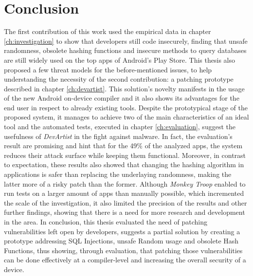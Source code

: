 \chapter{Conclusion}
The first contribution of this work used the empirical data in chapter \ref{ch:investigation} to show that developers still code insecurely, finding that unsafe randomness, obsolete hashing functions and insecure methods to query databases are still widely used on the top apps of Android's Play Store. This thesis also proposed a few threat models for the before-mentioned issues, to help understanding the necessity of the second contribution: a patching prototype described in chapter \ref{ch:devartist}. This solution's novelty manifests in the usage of the new Android on-device compiler and it also shows its advantages for the end user in respect to already existing tools. Despite the prototypical stage of the proposed system, it manages to achieve two of the main characteristics of an ideal tool and the automated tests, executed in chapter \ref{ch:evaluation}, suggest the usefulness of \emph{DevArtist} in the fight against malware. In fact, the evaluation's result are promising and hint that for the 49\% of the analyzed apps, the system reduces their attack surface while keeping them functional. Moreover, in contrast to expectation, these results also showed that changing the hashing algorithm in applications is safer than replacing the underlaying randomness, making the latter more of a risky patch than the former. Although \emph{Monkey Troop} enabled to run tests on a larger amount of apps than manually possible, which incremented the scale of the investigation, it also limited the precision of the results and other further findings, showing that there is a need for more research and development in the area. In conclusion, this thesis evaluated the need of patching vulnerabilities left open by developers, suggests a partial solution by creating a prototype addressing SQL Injections, unsafe Random usage and obsolete Hash Functions, thus showing, through evaluation, that patching those vulnerabilities can be done effectively at a compiler-level and increasing the overall security of a device.







     